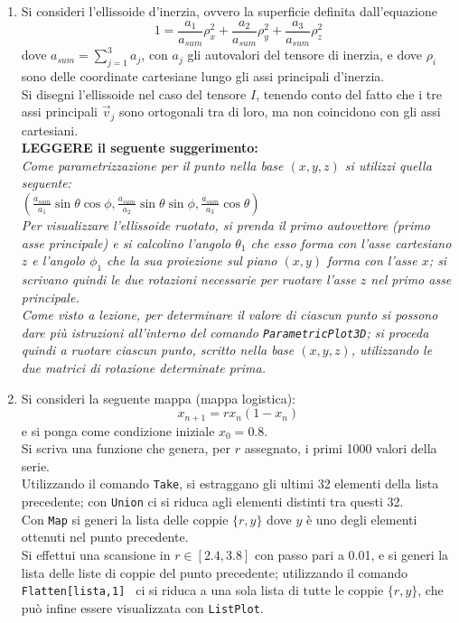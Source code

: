 \documentclass[12pt,italian]{article}
\newcommand{\be}{\begin{equation}}
\newcommand{\ee}{\end{equation}}
\begin{document}
\begin{enumerate}
\item
Si consideri l'ellissoide d'inerzia, ovvero la superficie definita dall'equazione
\be
1 = \frac{a_1}{a_{sum}} \rho_x^2 +
    \frac{a_2}{a_{sum}} \rho_y^2 +
    \frac{a_3}{a_{sum}} \rho_z^2 
\ee
dove $a_{sum}=\sum_{j=1}^3 a_j$, con $a_j$ gli autovalori del tensore di inerzia, e dove $\rho_i$ sono delle coordinate cartesiane lungo gli assi principali d'inerzia.\\
Si disegni l'ellissoide nel caso del tensore $I$,
tenendo conto del fatto che i tre assi principali $\vec v_j$ sono ortogonali tra di loro, ma non coincidono con gli assi cartesiani.\\
{\bf LEGGERE il seguente suggerimento:}\\
{\it Come parametrizzazione per il punto nella base $(x,y,z)$ si utilizzi quella seguente:\\
$ (\frac{a_{sum}}{a_1} \sin\theta\cos\phi ,\frac{a_{sum}}{a_2} \sin\theta\sin\phi,
\frac{a_{sum}}{a_3} \cos\theta ) $\\
Per visualizzare l'ellissoide ruotato,
si prenda il primo autovettore (primo asse principale) e si calcolino l'angolo $\theta_1$  che esso forma con l'asse cartesiano $z$ e l'angolo $\phi_1$ che la sua proiezione sul piano $(x,y)$ forma con l'asse $x$; si scrivano quindi le due rotazioni necessarie per ruotare l'asse $z$ nel primo asse principale.\\
Come visto a lezione, per determinare il valore di ciascun punto si possono dare pi\`u istruzioni all'interno del comando {\tt ParametricPlot3D}; si proceda quindi a ruotare ciascun punto, scritto nella base $(x,y,z)$, utilizzando le due matrici di rotazione determinate prima.
 }


\item
Si consideri la seguente mappa (mappa logistica):
\be
x_{n+1}= r x_n (1-x_n)
\label{eq:logistica}
\ee
e si ponga come condizione iniziale $x_0=0.8$.\\
Si scriva una funzione che genera, per $r$ assegnato, i primi 1000 valori della serie.\\
Utilizzando il comando {\tt Take}, si estraggano gli ultimi 32 elementi della lista precedente; con {\tt Union} ci si riduca agli elementi distinti tra questi 32.\\
Con {\tt Map} si generi la lista delle coppie $\{r,y\}$ dove $y$ \`e uno degli elementi ottenuti nel punto precedente.\\
Si effettui una scansione in $r\in [2.4,3.8]$ con passo pari a 0.01, e si generi la lista delle liste di coppie del punto precedente; utilizzando il comando {\tt Flatten[lista,1] } ci si riduca a una sola lista di tutte le coppie $\{r,y\}$,  che pu\`o infine essere visualizzata con {\tt ListPlot}.


\end{enumerate}
\end{document}
